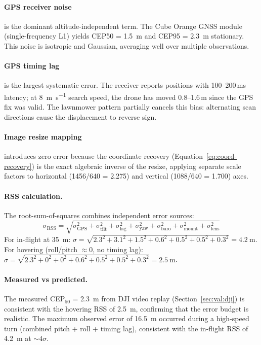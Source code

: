 \documentclass[10pt,a4paper]{article}
\begin{document}
\paragraph{GPS receiver noise} is the dominant altitude-independent term.  The Cube Orange GNSS module (single-frequency L1) yields CEP50 = \SI{1.5}{\metre} and CEP95 = \SI{2.3}{\metre} stationary. This noise is isotropic and Gaussian, averaging well over multiple observations.

\paragraph{GPS timing lag} is the largest systematic error.  The receiver reports positions with 100--200\,ms latency; at \SI{8}{\metre\per\second} search speed, the drone has moved 0.8--1.6\,m since the GPS fix was valid.  The lawnmower pattern partially cancels this bias: alternating scan directions cause the displacement to reverse sign.

\paragraph{Image resize mapping} introduces zero error because the coordinate recovery (Equation~\ref{eq:coord-recovery}) is the exact algebraic inverse of the resize, applying separate scale factors to horizontal (1456/640 = 2.275) and vertical (1088/640 = 1.700) axes.

\paragraph{RSS calculation.} The root-sum-of-squares combines independent error sources:
\begin{equation}\label{eq:rss}
  \sigma_\mathrm{RSS} = \sqrt{\sigma_\mathrm{GPS}^2 + \sigma_\mathrm{tilt}^2 + \sigma_\mathrm{lag}^2 + \sigma_\mathrm{yaw}^2 + \sigma_\mathrm{baro}^2 + \sigma_\mathrm{mount}^2 + \sigma_\mathrm{lens}^2}
\end{equation}
For in-flight at \SI{35}{\metre}: $\sigma = \sqrt{2.3^2 + 3.1^2 + 1.5^2 + 0.6^2 + 0.5^2 + 0.5^2 + 0.3^2} = \SI{4.2}{\metre}$.  For hovering (roll/pitch $\approx 0$, no timing lag): $\sigma = \sqrt{2.3^2 + 0^2 + 0^2 + 0.6^2 + 0.5^2 + 0.5^2 + 0.3^2} = \SI{2.5}{\metre}$.

\paragraph{Measured vs predicted.}  The measured CEP$_{50}$ = \SI{2.3}{\metre} from DJI video replay (Section~\ref{sec:val:dji}) is consistent with the hovering RSS of \SI{2.5}{\metre}, confirming that the error budget is realistic.  The maximum observed error of \SI{16.5}{\metre} occurred during a high-speed turn (combined pitch + roll + timing lag), consistent with the in-flight RSS of \SI{4.2}{\metre} at ${\sim}4\sigma$.
\end{document}
